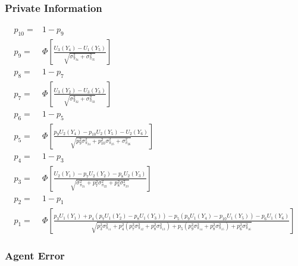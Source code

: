 \documentclass{article}
\begin{document}
\subsubsection{Private Information}

\begin{align*}
  p_{10} =& 1 - p_{9} \\    
  p_{9} =& \Phi
  \left[
    \frac{U_{3}(Y_{4}) - U_{1}(Y_{5})}
    {\sqrt{\sigma^{2}_{\pi_{34}} + \sigma^{2}_{\pi_{35}}}}
  \right] \\
  p_{8} =& 1 - p_{7} \\    
  p_{7} =& \Phi
  \left[
    \frac{U_{3}(Y_{2}) - U_{3}(Y_{3})}
    {\sqrt{\sigma^{2}_{\pi_{32}} + \sigma^{2}_{\pi_{33}}}}
  \right] \\
  p_{6} =& 1 - p_{5} \\
  p_{5} =& \Phi
  \left[
    \frac{p_{9}U_{2}(Y_{4}) - p_{10}U_{2}(Y_{5}) - U_{2}(Y_{6})}
    {\sqrt{p_{9}^{2} \sigma^{2}_{\pi_{24}} + p_{10}^{2} \sigma^{2}_{\pi_{25}} + \sigma^{2}_{\pi_{26}}}}
  \right] \\
  p_{4} =& 1 - p_{3} \\
  p_{3} =& \Phi
  \left[
    \frac{U_{2}(Y_{1}) - p_{7}U_{2}(Y_{2}) - p_{8}U_{2}(Y_{3})}
    {\sqrt{\sigma^{2}_{\pi_{21}} + p_{7}^{2} \sigma^{2}_{\pi_{22}} + p_{8}^{2} \sigma^{2}_{\pi_{23}}}}
  \right] \\
  p_{2} =& 1 - p_{1} \\
  p_{1} =& \Phi
  \left[
    \frac{p_{3}U_{1}(Y_{1}) + p_{4}
      \left(
        p_{7}U_{1}(Y_{2}) - p_{8}U_{1}(Y_{3})
      \right)
    - p_{5}
    \left(
      p_{9} U_{1}(Y_{4}) - p_{10} U_{1}(Y_{5})
    \right)
    - p_{6} U_{1}(Y_{6})
    }
    {\sqrt{p_{3}^{2} \sigma^{2}_{\pi_{11}} +
        p_{4}^{2} \left(
          p_{7}^{2} \sigma^{2}_{\pi_{12}} + p_{8}^{2} \sigma^{2}_{\pi_{13}}
        \right) 
      + p_{5}
      \left(
        p_{9}^{2} \sigma^{2}_{\pi_{14}} + p_{8}^{2} \sigma^{2}_{\pi_{15}}
      \right)
    + p_{6}^{2} \sigma^{2}_{\pi_{16}}}}
  \right] 
\end{align*}

\subsubsection{Agent Error}
\end{document}
